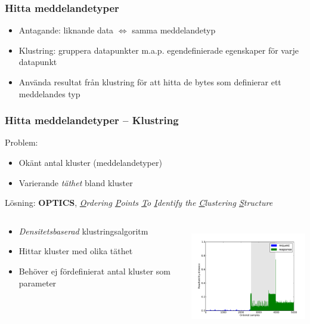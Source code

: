 \documentclass[xetex]{beamer}
\begin{document}
    \begin{frame}
        \frametitle{Hitta meddelandetyper}
        \begin{itemize}
            \item Antagande: liknande data $\Leftrightarrow$ samma meddelandetyp
            \item Klustring: gruppera datapunkter m.a.p. egendefinierade egenskaper
                för varje datapunkt
            \item Använda resultat från klustring för att hitta de bytes som
                definierar ett meddelandes typ
        \end{itemize}
    \end{frame}
    \begin{frame}
        \frametitle{Hitta meddelandetyper -- Klustring}
        Problem:
        \begin{itemize}
            \item Okänt antal kluster (meddelandetyper)
            \item Varierande \emph{täthet} bland kluster
        \end{itemize}
        Lösning: \textbf{OPTICS}, \scriptsize{
            \emph{\underline{O}rdering \underline{P}oints \underline{T}o
                  \underline{I}dentify the \underline{C}lustering 
                  \underline{S}tructure}}
        \vskip20pt
        \begin{columns}[t]
            \begin{column}[T]{6cm}
                \begin{itemize}
                    \item \emph{Densitetsbaserad} klustringsalgoritm
                    \item Hittar kluster med olika täthet
                    \item Behöver ej fördefinierat antal kluster som parameter
                \end{itemize}
            \end{column}
            \begin{column}[T]{6cm}
                \includegraphics[height=4.5cm]{img/hierextr.pdf}
            \end{column}
        \end{columns}
    \end{frame}
\end{document}
